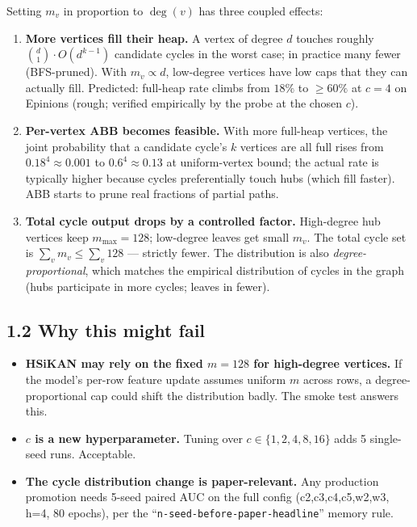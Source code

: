 \documentclass[a4paper,11pt]{article}
\begin{document}
Setting $m_v$ in proportion to $\deg(v)$ has three coupled effects:

\begin{enumerate}
  \item \textbf{More vertices fill their heap.}  A vertex of degree
    $d$ touches roughly $\binom{d}{1}\cdot O(d^{k-1})$ candidate
    cycles in the worst case; in practice many fewer (BFS-pruned).
    With $m_v \propto d$, low-degree vertices have low caps that
    they can actually fill.  Predicted: full-heap rate climbs from
    $18\%$ to $\ge 60\%$ at $c = 4$ on Epinions
    (rough; verified empirically by the probe at the chosen $c$).
  \item \textbf{Per-vertex ABB becomes feasible.}  With more
    full-heap vertices, the joint probability that a candidate
    cycle's $k$ vertices are all full rises from $0.18^4 \approx
    0.001$ to $0.6^4 \approx 0.13$ at uniform-vertex bound; the
    actual rate is typically higher because cycles preferentially
    touch hubs (which fill faster).  ABB starts to prune real
    fractions of partial paths.
  \item \textbf{Total cycle output drops by a controlled factor.}
    High-degree hub vertices keep $m_\text{max} = 128$; low-degree
    leaves get small $m_v$.  The total cycle set is
    $\sum_v m_v \le \sum_v 128$ — strictly fewer.  The distribution
    is also \emph{degree-proportional}, which matches the empirical
    distribution of cycles in the graph (hubs participate in more
    cycles; leaves in fewer).
\end{enumerate}

\subsection*{1.2 Why this might fail}

\begin{itemize}
  \item \textbf{HSiKAN may rely on the fixed $m{=}128$ for high-degree
    vertices.}  If the model's per-row feature update assumes uniform
    $m$ across rows, a degree-proportional cap could shift the
    distribution badly.  The smoke test answers this.
  \item \textbf{$c$ is a new hyperparameter.}  Tuning over $c \in
    \{1, 2, 4, 8, 16\}$ adds 5 single-seed runs.  Acceptable.
  \item \textbf{The cycle distribution change is paper-relevant.}
    Any production promotion needs 5-seed paired AUC on the full
    config (c2,c3,c4,c5,w2,w3, h=4, 80 epochs), per the
    ``\texttt{n-seed-before-paper-headline}'' memory rule.
\end{itemize}
\end{document}
